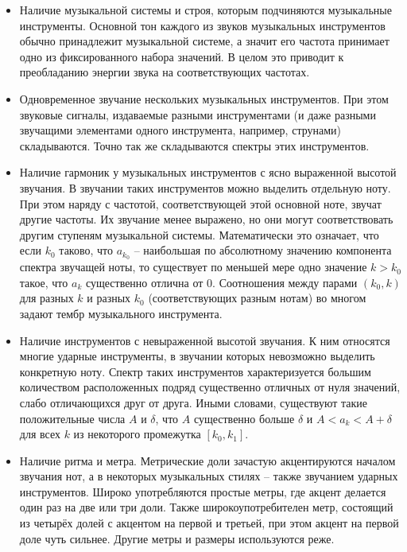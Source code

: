 \begin{itemize}
  \item Наличие музыкальной системы и строя, которым подчиняются музыкальные
  инструменты. Основной тон каждого из звуков музыкальных инструментов обычно
  принадлежит музыкальной системе, а значит его частота принимает одно из
  фиксированного набора значений. В целом это приводит к преобладанию энергии
  звука на соответствующих частотах. 
  
  \item Одновременное звучание нескольких музыкальных инструментов. При этом
  звуковые сигналы, издаваемые разными инструментами (и даже разными звучащими
  элементами одного инструмента, например, струнами) складываются. Точно так же
  складываются спектры этих инструментов.
  
  \item Наличие гармоник у музыкальных инструментов с ясно выраженной высотой
  звучания. В звучании таких инструментов можно выделить отдельную ноту. При
  этом наряду с частотой, соответствующей этой основной ноте, звучат другие
  частоты. Их звучание менее выражено, но они могут соответствовать другим
  ступеням музыкальной системы. Математически это означает, что если $k_0$
  таково, что $a_{k_0}$ -- наибольшая по абсолютному значению компонента спектра
  звучащей ноты, то существует по меньшей мере одно значение $k > k_0$ такое,
  что $a_k$ существенно отлична от 0. Соотношения между парами $(k_0, k)$ для
  разных $k$ и разных $k_0$ (соответствующих разным нотам) во многом задают
  тембр музыкального инструмента.
  
  \item Наличие инструментов с невыраженной высотой звучания. К ним относятся
  многие ударные инструменты, в звучании которых невозможно выделить конкретную
  ноту. Спектр таких инструментов характеризуется большим количеством
  расположенных подряд существенно отличных от нуля значений, слабо отличающихся
  друг от друга. Иными словами, существуют такие положительные числа $A$ и
  $\delta$, что $A$ существенно больше $\delta$ и $A < a_k < A + \delta$ для
  всех $k$ из некоторого промежутка $[k_0, k_1]$.
  
  \item Наличие ритма и метра. Метрические доли зачастую акцентируются началом
  звучания нот, а в некоторых музыкальных стилях -- также звучанием ударных
  инструментов. Широко употребляются простые метры, где акцент делается один раз
  на две или три доли. Также широкоупотребителен метр, состоящий из четырёх
  долей с акцентом на первой и третьей, при этом акцент на первой доле чуть
  сильнее. Другие метры и размеры используются реже.
  

\end{itemize}
